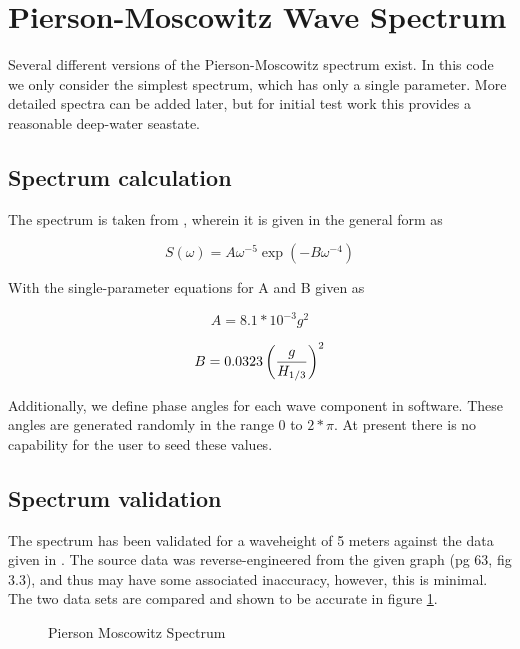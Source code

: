 \section{Pierson-Moscowitz Wave Spectrum}

Several different versions of the Pierson-Moscowitz spectrum exist. In this code we only consider the simplest spectrum, which has only a single parameter. More detailed spectra can be added later, but for initial test work this provides a reasonable deep-water seastate.
 
\subsection{Spectrum calculation}

The spectrum is taken from \cite{unknown-unknown-GuidanceandControl}, wherein it is given in the general form as

\begin{equation}
S(\omega)=A \omega^{-5} \exp(-B \omega^{-4})
\label{eq:PM-general}
\end{equation}

\noindent
With the single-parameter equations for A and B given as

\begin{equation}
A=8.1*10^{-3} g^2
\label{eq:PM-singleParamA}
\end{equation}

\begin{equation}
B=0.0323 \left( g \over H_{1/3} \right)^2
\label{eq:PM-singleParamB}
\end{equation}

\noindent
Additionally, we define phase angles for each wave component in software. These angles are generated randomly in the range $0$ to $2*\pi$. At present there is no capability for the user to seed these values.

\subsection{Spectrum validation}

The spectrum has been validated for a waveheight of 5 meters against the data given in \cite{unknown-unknown-GuidanceandControl}. The source data was reverse-engineered from the given graph (pg 63, fig 3.3), and thus may have some associated inaccuracy, however, this is minimal. The two data sets are compared and shown to be accurate in figure \ref{fig:pmmag}.

\begin{figure}[h]
  \centering
  
%  
  \caption{Pierson Moscowitz Spectrum}
  \label{fig:pmmag}
\end{figure}
